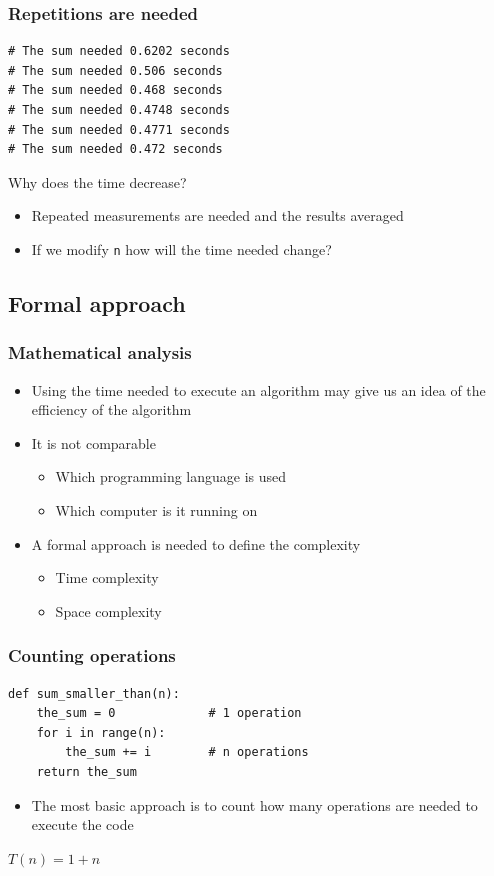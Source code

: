 \documentclass[11pt]{beamer}
\begin{document}
\begin{frame}[fragile]\frametitle{Repetitions are needed}
\begin{lstlisting}
# The sum needed 0.6202 seconds
# The sum needed 0.506 seconds
# The sum needed 0.468 seconds
# The sum needed 0.4748 seconds
# The sum needed 0.4771 seconds
# The sum needed 0.472 seconds
\end{lstlisting}
\begin{block}{}
\centering Why does the time decrease?
\end{block}
\pause
\begin{itemize}
\item Repeated measurements are needed and the results averaged
\item If we modify \texttt{n} how will the time needed change?
\end{itemize}
\end{frame}

\subsection{Formal approach}

\begin{frame}\frametitle{Mathematical analysis}
\begin{itemize}
\item Using the time needed to execute an algorithm may give us an idea of the efficiency of the algorithm
\pause
\item It is not comparable 
\begin{itemize}
\item Which programming language is used
\item Which computer is it running on
\end{itemize}
\pause
\item A formal approach is needed to define the complexity
\begin{itemize}
\item Time complexity
\item Space complexity
\end{itemize}
\end{itemize}
\end{frame}

\begin{frame}[fragile]\frametitle{Counting operations}
\begin{lstlisting}
def sum_smaller_than(n):
    the_sum = 0				# 1 operation
    for i in range(n):
        the_sum += i		# n operations
    return the_sum
\end{lstlisting}
\begin{itemize}
\item The most basic approach is to count how many operations are needed to execute the code
\end{itemize}
\pause
\begin{block}{}
\centering$T(n) = 1 + n$
\end{block}
\end{frame}
\end{document}

